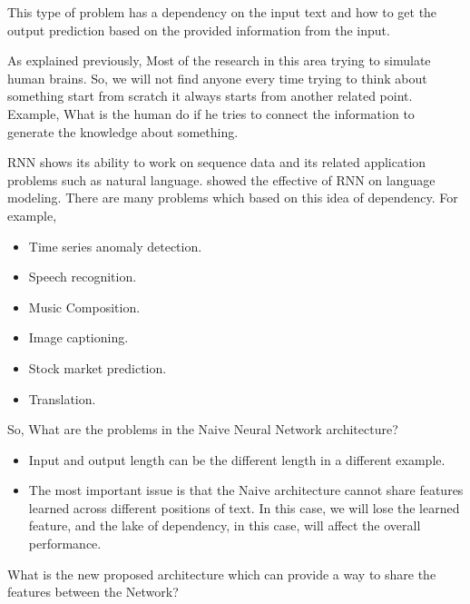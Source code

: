 This type of problem has a dependency on the input text and how to get the output prediction based on the provided information from the input.

As explained previously, Most of the research in this area trying to simulate human brains. So, we will not find anyone every time trying to think about something start from scratch it always starts from another related point. Example, What is the human do if he tries to connect the information to generate the knowledge about something.

RNN shows its ability to work on sequence data and its related application problems such as natural language\cite{Mikolov_et_al}. showed the effective of RNN on language modeling. There are many problems which based on this idea of dependency. For example,
\begin{itemize}
\item Time series anomaly detection.
\item Speech recognition.
\item Music Composition.
\item Image captioning.
\item Stock market prediction.
\item Translation.
\end{itemize}
So, What are the problems in the Naive Neural Network architecture?
\begin{itemize}
\item Input and output length can be the different length in a different example.
\item The most important issue is that the Naive architecture cannot share features learned across different positions of text. In this case, we will lose the learned feature, and the lake of dependency, in this case, will affect the overall performance.
\end{itemize}
What is the new proposed architecture which can provide a way to share the features between the Network?
